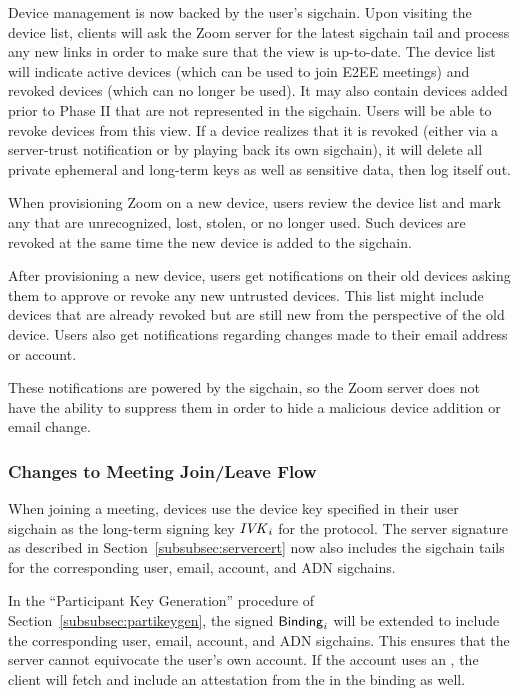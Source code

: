 Device management is now backed by the user’s sigchain. Upon visiting the device list, clients will
ask the Zoom server for the latest sigchain tail and process any new links in order to make sure
that the view is up-to-date. The device list will indicate active devices (which can be used to join
E2EE meetings) and revoked devices (which can no longer be used). It may also contain devices added
prior to Phase II that are not represented in the sigchain. Users will be able to revoke devices
from this view. If a device realizes that it is revoked (either via a server-trust notification or
by playing back its own sigchain), it will delete all private ephemeral and long-term keys as well
as sensitive data, then log itself out.

When provisioning Zoom on a new device, users review the device list and mark any that are
unrecognized, lost, stolen, or no longer used. Such devices are revoked at the same time the new
device is added to the sigchain.

After provisioning a new device, users get notifications on their old devices asking them to approve
or revoke any new untrusted devices. This list might include devices that are already revoked but
are still new from the perspective of the old device. Users also get notifications regarding changes made to their email address or account.

These notifications are powered by the sigchain, so the Zoom server does not have the ability to
suppress them in order to hide a malicious device addition or email change.

\subsubsection{Changes to Meeting Join/Leave Flow}

When joining a meeting, devices use the device key specified in their user sigchain as the long-term
signing key $\mathit{IVK}_i$ for the protocol. The server signature as described in
Section~\ref{subsubsec:servercert} now also includes the sigchain tails for the corresponding user, email, account, and ADN sigchains.

In the ``Participant Key Generation'' procedure of Section~\ref{subsubsec:partikeygen}, the signed
${\sf Binding}_i$ will be extended to include the corresponding user, email, account, and ADN sigchains. This ensures that the server
cannot equivocate the user’s own account. If the account uses an \idp, the client will fetch and
include an attestation from the \idp in the binding as well.

